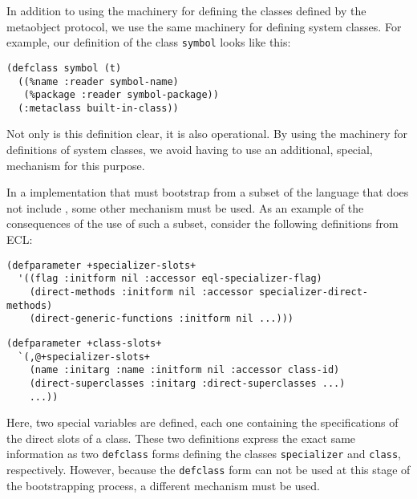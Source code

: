 In addition to using the \clos{} machinery for defining the classes
defined by the metaobject protocol, we use the same machinery for
defining system classes.  For example, our definition of the class
\texttt{symbol} looks like this:

\begin{verbatim}
(defclass symbol (t)
  ((%name :reader symbol-name)
   (%package :reader symbol-package))
  (:metaclass built-in-class))
\end{verbatim}

Not only is this definition clear, it is also operational.  By using
the \clos{} machinery for definitions of system classes, we avoid
having to use an additional, special, mechanism for this purpose.

In a \commonlisp{} implementation that must bootstrap \clos{} from a
subset of the language that does not include \clos{}, some other
mechanism must be used.  As an example of the consequences of the use
of such a subset, consider the following definitions from ECL:

\begin{verbatim}
(defparameter +specializer-slots+
  '((flag :initform nil :accessor eql-specializer-flag)
    (direct-methods :initform nil :accessor specializer-direct-methods)
    (direct-generic-functions :initform nil ...)))
\end{verbatim}

\begin{verbatim}
(defparameter +class-slots+
  `(,@+specializer-slots+
    (name :initarg :name :initform nil :accessor class-id)
    (direct-superclasses :initarg :direct-superclasses ...)
    ...))
\end{verbatim}

Here, two special variables are defined, each one containing the
specifications of the direct slots of a class.  These two definitions
express the exact same information as two \texttt{defclass} forms
defining the classes \texttt{specializer} and \texttt{class},
respectively.  However, because the \texttt{defclass} form can not be
used at this stage of the bootstrapping process, a different mechanism
must be used.
